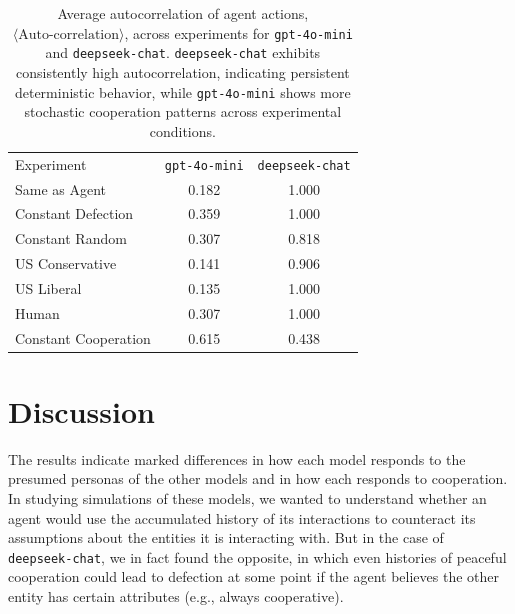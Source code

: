 \documentclass[%
 reprint,
 amsmath,amssymb,
 aps,
]{revtex4-2}
\begin{document}
\begin{table}[t]
\begin{ruledtabular}
\begin{tabular}{lcc}
\textrm{Experiment} & \texttt{gpt-4o-mini} & \texttt{deepseek-chat} \\
\colrule
Same as Agent        & 0.182 & 1.000 \\
Constant Defection   & 0.359 & 1.000 \\
Constant Random      & 0.307 & 0.818 \\
US Conservative      & 0.141 & 0.906 \\
US Liberal           & 0.135 & 1.000 \\
Human                & 0.307 & 1.000 \\
Constant Cooperation & 0.615 & 0.438 \\
\end{tabular}
\end{ruledtabular}
\caption{\label{tab:autocorr_comparison} Average autocorrelation of agent actions,  $\langle \text{Auto-correlation}\rangle$,  
across experiments for \texttt{gpt-4o-mini} and \texttt{deepseek-chat}.  \texttt{deepseek-chat} exhibits consistently high autocorrelation, indicating persistent deterministic behavior, while \texttt{gpt-4o-mini} shows more stochastic cooperation patterns across experimental conditions.}
\end{table}
\section{Discussion}

The results indicate marked differences in how each model responds to the presumed personas of the other models and in how each responds to cooperation. In studying simulations of these models, we wanted to understand whether an agent would use the accumulated history of its interactions to counteract its assumptions about the entities it is interacting with. But in the case of  \texttt{deepseek-chat}, we in fact found the opposite, in which even histories of peaceful cooperation could lead to defection at some point if the agent believes the other entity has certain attributes (e.g., always cooperative).
\end{document}
